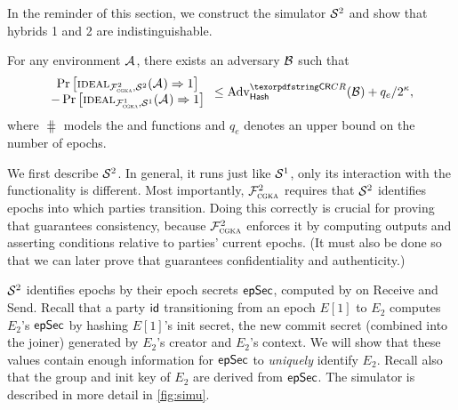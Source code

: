 In the reminder of this section, we construct the simulator $\mathcal{S}_{\textsc{\relax}}^2$ and show that hybrids 1 and 2 are indistinguishable.
\begin{theorem}
  For any environment $\mathcal{A}_{\relax}$, there exists an adversary $\mathcal{B}_{\relax}$ such that
  \begin{equation*}\normalfont
   \begin{array}{c}
    \Pr\left[\ucideal_{\funcCGKA^2, \ucsim^2}(\Adv) \Rightarrow 1\right] \\- \Pr\left[\ucideal_{\funcCGKA^1,
      \ucsim^1}(\Adv) \Rightarrow 1\right]
    \end{array}
    \leq \textnormal{Adv}^{\gamefont{CR}}_{\hash}(\Bdv) + q_e/2^\kappa,
  \end{equation*}
  where $\hash$ models the \hkdfexp and \hkdfext functions and $q_e$ denotes an upper bound on the number of epochs.
\label{thm:itk1}\end{theorem}

We first describe $\mathcal{S}_{\textsc{\relax}}^2$. In general, it runs \saik just like $\mathcal{S}_{\textsc{\relax}}^1$, only its interaction with the functionality is different. Most importantly, $\mathcal{F}_{\normalfont\textsc{cgka}}^2$ requires that $\mathcal{S}_{\textsc{\relax}}^2$ identifies epochs into which parties transition. Doing this correctly is crucial for proving that \saik guarantees consistency, because $\mathcal{F}_{\normalfont\textsc{cgka}}^2$ enforces it by computing outputs and asserting conditions relative to parties' current epochs. (It must also be done so that we can later prove that \saik guarantees confidentiality and authenticity.)

$\mathcal{S}_{\textsc{\relax}}^2$ identifies epochs by their epoch secrets ${\mathsf{epSec}}$, computed by \saik on Receive and Send. Recall that a party ${\mathsf{id}}$ transitioning from an epoch $E[1]$ to $E_2$ computes $E_2$'s ${\mathsf{epSec}}$ by hashing $E[1]$'s init secret, the new commit secret (combined into the joiner) generated by $E_2$'s creator and $E_2$'s context. We will show that these values contain enough information for ${\mathsf{epSec}}$ to \emph{uniquely} identify $E_2$. Recall also that the group and init key of $E_2$ are derived from ${\mathsf{epSec}}$.
The simulator is described in more detail in \cref{fig:simu}.

